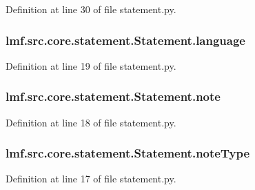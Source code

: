 Definition at line 30 of file statement.\+py.

\hypertarget{classlmf_1_1src_1_1core_1_1statement_1_1_statement_a71a5b6eaf4bad349ab3399fbea06b88d}{
\subsubsection[{language}]{\setlength{\rightskip}{0pt plus 5cm}lmf.\+src.\+core.\+statement.\+Statement.\+language}}\label{classlmf_1_1src_1_1core_1_1statement_1_1_statement_a71a5b6eaf4bad349ab3399fbea06b88d}


Definition at line 19 of file statement.\+py.

\hypertarget{classlmf_1_1src_1_1core_1_1statement_1_1_statement_a231fe52b0b7ba3deb6d0993987dddaf0}{
\subsubsection[{note}]{\setlength{\rightskip}{0pt plus 5cm}lmf.\+src.\+core.\+statement.\+Statement.\+note}}\label{classlmf_1_1src_1_1core_1_1statement_1_1_statement_a231fe52b0b7ba3deb6d0993987dddaf0}


Definition at line 18 of file statement.\+py.

\hypertarget{classlmf_1_1src_1_1core_1_1statement_1_1_statement_abc61d06d03119e6e12d5c3854afc93c1}{
\subsubsection[{note\+Type}]{\setlength{\rightskip}{0pt plus 5cm}lmf.\+src.\+core.\+statement.\+Statement.\+note\+Type}}\label{classlmf_1_1src_1_1core_1_1statement_1_1_statement_abc61d06d03119e6e12d5c3854afc93c1}


Definition at line 17 of file statement.\+py.

